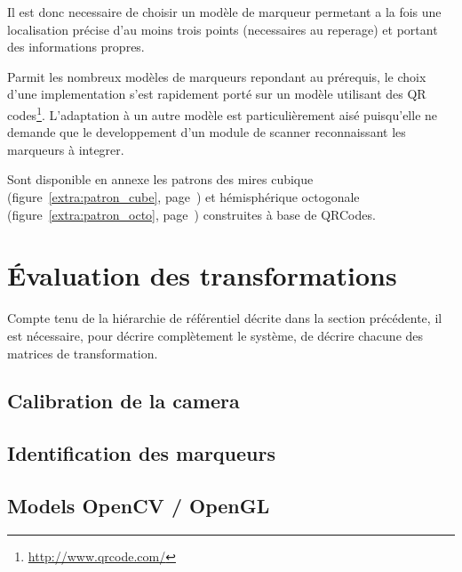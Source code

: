 \documentclass[10pt,a4paper,twoside, twocolumn]{report}
\newcommand*{\rootPath}{../}
\begin{document}
Il est donc necessaire de choisir un modèle de marqueur permetant a la fois une localisation précise d'au moins trois points (necessaires au reperage) et portant des informations propres.

Parmit les nombreux modèles de marqueurs repondant au prérequis, le choix d'une implementation s'est rapidement porté sur un modèle utilisant des QR codes\footnote{\url{http://www.qrcode.com/}}. L'adaptation à un autre modèle est particulièrement aisé puisqu'elle ne demande que le developpement d'un module de scanner reconnaissant les marqueurs à integrer.

Sont disponible en annexe les patrons des mires cubique (figure~\ref{extra:patron_cube}, page~\pageref{extra:patron_cube}) et hémisphérique octogonale (figure~\ref{extra:patron_octo}, page~\pageref{extra:patron_octo}) construites à base de QRCodes.



\section{Évaluation des transformations}

Compte tenu de la hiérarchie de référentiel décrite dans la section précédente, il est nécessaire, pour décrire complètement le système, de décrire chacune des matrices de transformation. 

\subsection{Calibration de la camera}
\subsection{Identification des marqueurs}
\subsection{Models OpenCV / OpenGL}



\ifstandalone
	
	
\fi
\end{document}

